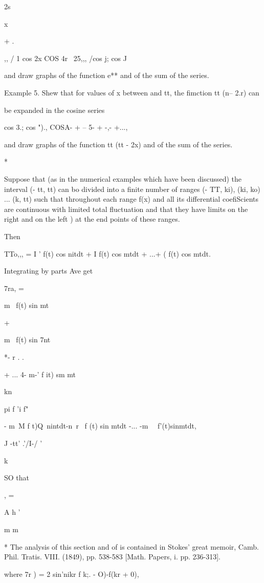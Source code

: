 2s

 x

+ .

,, / 1 cos 2x COS 4r \ 25,,, /cos j; cos J

and draw graphs of the function e** and of the sum of the series.

Example 5. Shew that for values of x between and tt, the fimction tt
(n-- 2.r) can

be expanded in the cosine series

cos 3.; cos ")., COSA- + -- 5- + -,- +...,

and draw graphs of the function tt (tt - 2x) and of the sum of the
series.

*

Suppose that (as in the numerical examples which have been discussed)
the interval (- tt, tt) can bo divided into a finite number of ranges
(- TT, ki), (ki, ko) ... (k, tt) such that throughout each range f(x)
and all its differential coefiScients are continuous with limited
total fluctuation and that they have limits on the right and on the
left ) at the end points of these ranges.

Then

TTo,,, = I ' f(t) cos nitdt + I f(t) cos mtdt + ...+ ( f(t) cos mtdt.

Integrating by parts Ave get

7ra, =

m~ f(t) sin mt

+

m~ f(t) sin 7nt

*- r . .

+ ... 4- m-' f it) sm mt

kn

pi f 'i f"

- m~M f t)Q\ nintdt-n\ r \ f (t) sin mtdt -... -m~ \ f'(t)sinmtdt,

J -tt' .'/I-/ '

k

SO that

, =

A h '

m m

* The analysis of this section and of is contained in Stokes'
great memoir, Camb. Phil. Tratis. VIII. (1849), pp. 538-583 [Math.
Papers, i. pp. 236-313].

%
%

where 7r ) = 2 sin'nikr f k;. - O)-f(kr + 0),

